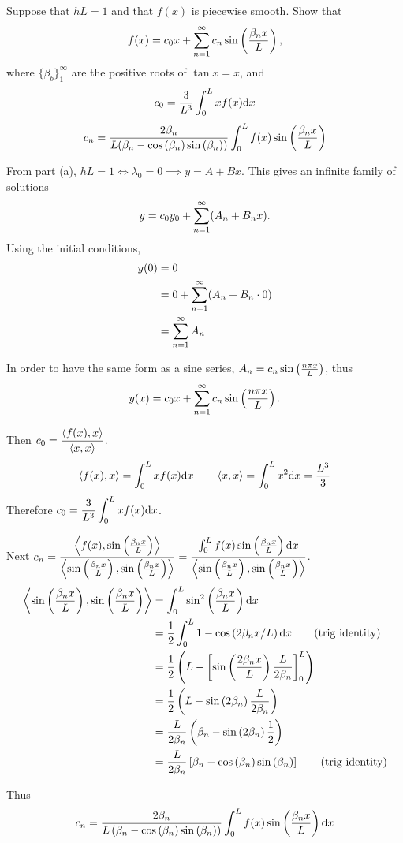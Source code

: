 
Suppose that $hL = 1$ and that $f(x)$ is piecewise smooth. Show that
$$f(x) = c_0 x + \sumn{1} c_n \sinp{\frac{\beta_n x}{L}},$$
where $\{\beta_b\}_1^{\infty}$ are the positive roots of $\tan x = x$, and 
$$c_0 = \frac{3}{L^3} \int_{0}^L x f(x) \dd x$$
$$c_n = \frac{2\beta_n}{L(\beta_n - \cosp{\beta_n} \sinp{\beta_n})} \intl f(x) \sinp{\frac{\beta_n x}{L}}$$

\soln* 
From part (a), $hL = 1 \iff \lambda_0 = 0 \implies y = A + Bx$. This gives an infinite family of solutions
$$y = c_0 y_0 + \sum_{n=1}^{\infty} (A_n + B_n x).$$ Using the initial conditions,
\begin{align*}
    y(0) &= 0 \\
    &= 0 + \sum_{n=1}^{\infty} (A_n + B_n \cdot 0)\\
    &= \sum_{n=1}^{\infty} A_n
\end{align*}

In order to have the same form as a sine series, $A_n = c_n \sinp{\npxl}$, thus
$$y(x) = c_0 x + \sumn{1} c_n \sinp{\npxl}.$$

Then $\displaystyle c_0 = \dfrac{\inner{f(x), x}}{\inner{x,x}}$.
$$\inner{f(x), x} = \intl x f(x) \dd x \qquad \inner{x,x} = \intl x^2 \dd x = \frac{L^3}{3}$$
Therefore $\displaystyle c_0 = \frac{3}{L^3} \int_{0}^L x f(x) \dd x$.

Next $\displaystyle c_n = \frac{
    \inner{f(x), \sinp{\bnxl}}
}{
    \inner{\sinp{\bnxl}, \sinp{\bnxl}}
} = \frac{
    \intl f(x) \sinp{\bnxl} \dd x
}{
    \inner{\sinp{\bnxl}, \sinp{\bnxl}}
}$.
\newpage
\begin{align*}
    \inner{\sinp{\bnxl}, \sinp{\bnxl}} &= \intl \sin^2 \pars{\bnxl} \dd x\\
    &= \over{2} \intl  1 - \cosp{2 \beta_n x / L} \dd x\tag{trig identity}\\
    &= \over{2} \pars{
        L - \brac{
            \sinp{\frac{2 \beta_n x}{L}} \frac{L}{2 \beta_n}
        }_0^L
    }\\
    &= \over{2} \pars{
        L - \sinp{2 \beta_n} \frac{L}{2 \beta_n}
    }\\
    &=  \frac{L}{2 \beta_n} \pars{
        \beta_n - \sinp{2 \beta_n} \frac{1}{2}
    }\\
    &= \frac{L}{2 \beta_n} \brac{
        \beta_n -  \cosp{\beta_n}\sinp{\beta_n}
    }\tag{trig identity} 
\end{align*}

Thus 
$$c_n =\frac{
   2 \beta_n 
}{
    L \pars{
        \beta_n -  \cosp{\beta_n}\sinp{\beta_n}
    }
}\intl f(x) \sinp{\bnxl} \dd x $$
